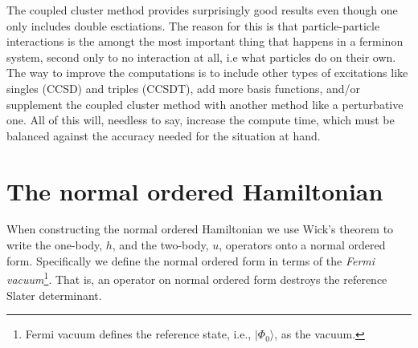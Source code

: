 \documentclass[
    a4paper, aps, twocolumn, floatfix, superscriptaddress,
    nofootinbib]{revtex4-1}
\newcommand{\1}{\mathds{1}}
\newcommand{\ket}[1]{\rvert #1\rangle}
\newcommand{\kslat}{\ket{\Phi_0}}
\begin{document}
        The coupled cluster method provides surprisingly good results even
        though one only includes double esctiations. The reason for this is that
        particle-particle interactions is the amongt the most important thing that
        happens in a ferminon system, second only to no interaction at all, i.e
        what particles do on their own. The way to improve the computations is to
        include other types of excitations like singles (CCSD) and triples (CCSDT),
        add more basis functions, and/or supplement the coupled cluster method with
        another method like a perturbative one. All of this will, needless to say,
        increase the compute time, which must be balanced against the accuracy needed
        for the situation at hand.

\vfill
\newpage
\appendix
\section{The normal ordered Hamiltonian}
    When constructing the normal ordered Hamiltonian we use Wick's theorem to
    write the one-body, $h$, and the two-body, $u$, operators onto a normal
    ordered form. Specifically we define the normal ordered form in terms of the
    \emph{Fermi vacuum}\footnote{Fermi vacuum defines the reference state, i.e.,
    $\kslat$, as the vacuum.}. That is, an operator on normal ordered form
    destroys the reference Slater determinant.
\end{document}
